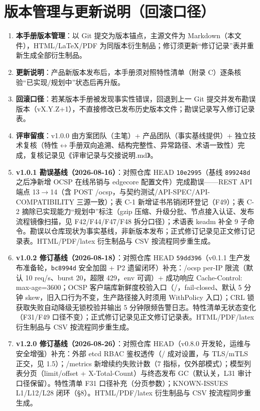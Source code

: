\chapter{版本管理与更新说明（回滚口径）}

\begin{enumerate}
  \item \textbf{本手册版本管理}：以 Git 提交为版本锚点，主源文件为 Markdown（本文件），HTML/LaTeX/PDF 为同版本衍生制品；修订须更新“修订记录”表并重新生成全部衍生制品。
  \item \textbf{更新说明}：产品新版本发布后，本手册须对照特性清单（附录 C）逐条核验“已实现/规划中”状态后再升版。
  \item \textbf{回滚口径}：若某版本手册被发现事实性错误，回退到上一 Git 提交并发布勘误版本（vX.Y.Z+1），不直接修改已发布历史版本文件；勘误记录写入修订记录表。
  \item \textbf{评审留痕}：v1.0.0 由方案团队（主笔）+ 产品团队（事实基线提供）+ 独立技术复核（特性$\leftrightarrow$手册双向追溯、结构完整性、异常路径、术语一致性）完成，复核记录见《评审记录与交接说明.md》。
  \item \textbf{v1.0.1 勘误基线（2026-08-16）}：对照仓库 HEAD \texttt{10e2995}（基线 \texttt{899248d} 之后净新增 OCSP 在线吊销与 edgecore 配置文件）完成勘误——REST API 端点 13$\rightarrow$14（含 POST /ocsp，与契约测试/API-SPEC/API-COMPATIBILITY 三源一致）；表 C-1 新增证书吊销闭环登记（F49）；表 C-2 摘除已实现能力“规划中”标注（gzip 压缩、升级分批、节点接入认证、发布流程镜像扫描，见 F42/F44/F47/F48 拆分口径）；术语表 keadm 补全 9 子命令。勘误以仓库现状为事实基线，非新版本发布；正式修订记录见正文修订记录表。HTML/PDF/latex 衍生制品与 CSV 按流程同步重生成。
  \item \textbf{v1.0.2 修订基线（2026-08-18）}：对照仓库 HEAD \texttt{59dd396}（v0.1.1 生产发布准备轮，\texttt{bc8994d} 安全加固 + P2 遗留闭环）补充：/ocsp per-IP 限流（默认 10 req/s、burst 20，超限 429，env 可调）+ 成功响应 Cache-Control: max-age=3600；OCSP 客户端库新鲜度校验入口（/，fail-closed、默认 5 分钟 skew，旧入口行为不变，生产路径接入时须用 WithPolicy 入口）；CRL 锁获取失败自动降级无锁校验并输出 5 分钟限频告警日志。特性清单无状态变化（F31/F49 口径不变）；正式修订记录见正文修订记录表。HTML/PDF/latex 衍生制品与 CSV 按流程同步重生成。
  \item \textbf{v1.2.0 修订基线（2026-08-26）}：对照仓库 HEAD（v0.8.0 开发轮，运维与安全增强）补充：外部 etcd RBAC 鉴权透传（/ 成对设置，与 TLS/mTLS 正交，见 1.5）；/metrics 新增续约失败计数（7 指标，仅外部模式）；模型列表分页（limit/offset + X-Total-Count）与终态发布 GC（默认关，L31 审计口径保留）。特性清单 F31 口径补充（分页参数）；KNOWN-ISSUES L1/L12/L28 闭环（§8）。HTML/PDF/latex 衍生制品与 CSV 按流程同步重生成。

\end{enumerate}
